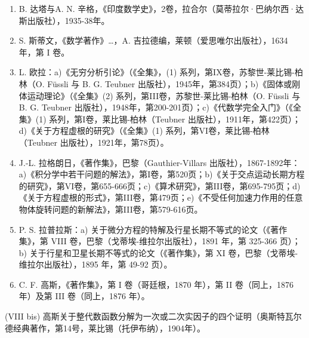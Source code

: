 \begin{enumerate}
\def\labelenumi{(\Roman{enumi})}
\setcounter{enumi}{2}
\item
  B. 达塔与A. N. 辛格，《印度数学史》，2卷，拉合尔（莫蒂拉尔·巴纳尔西·达斯出版社），1935-38年。
\item
  S. 斯蒂文，《数学著作》\ldots，A. 吉拉德编，莱顿（爱思唯尔出版社），1634 年，第 I 卷。
\item
  L. 欧拉：a)《无穷分析引论》（《全集》，(1) 系列，第IX卷，苏黎世-莱比锡-柏林（O. Füssli 与 B. G. Teubner 出版社），1945年，第384页）；b)《固体或刚体运动理论》（《全集》(2) 系列，第III卷，苏黎世-莱比锡-柏林（O. Füssli 与 B. G. Teubner 出版社），1948年，第200-201页）；c)《代数学完全入门》（《全集》(1) 系列，第I卷，莱比锡-柏林（Teubner 出版社），1911年，第422页）；d)《关于方程虚根的研究》（《全集》(1) 系列，第VI卷，莱比锡-柏林（Teubner 出版社），1921年，第78页）。
\item
  J.-L. 拉格朗日，《著作集》，巴黎（Gauthier-Villars 出版社），1867-1892年：a)《积分学中若干问题的解法》，第I卷，第520页；b)《关于交点运动长期方程的研究》，第VI卷，第655-666页；c)《算术研究》，第III卷，第695-795页；d)《关于方程虚根的形式》，第III卷，第479页；e)《不受任何加速力作用的任意物体旋转问题的新解法》，第III卷，第579-616页。
\item
  P. S. 拉普拉斯：a) 关于微分方程的特解及行星长期不等式的论文（《著作集》，第 VIII 卷，巴黎（戈蒂埃-维拉尔出版社），1891 年，第 325-366 页）；b) 关于行星和卫星长期不等式的论文（《著作集》，第 XI 卷，巴黎（戈蒂埃-维拉尔出版社），1895 年，第 49-92 页）。
\item
  C. F. 高斯，《著作集》，第 I 卷（哥廷根，1870 年），第 II 卷（同上，1876 年）及第 III 卷（同上，1876 年）。
\end{enumerate}

(VIII bis) 高斯关于整代数函数分解为一次或二次实因子的四个证明（奥斯特瓦尔德经典著作，第14号，莱比锡（托伊布纳），1904年）。

